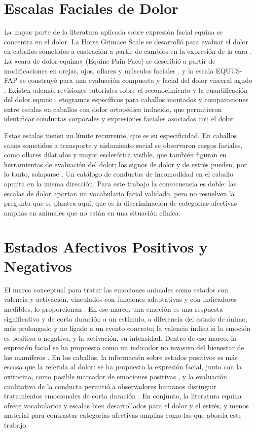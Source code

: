 \section{Escalas Faciales de Dolor}
La mayor parte de la literatura aplicada sobre expresión facial equina se concentra en el dolor. La Horse Grimace Scale se desarrolló para evaluar el dolor en caballos sometidos a castración a partir de cambios en la expresión de la cara \parencite{dallacosta2014}. La «cara de dolor equina» (Equine Pain Face) se describió a partir de modificaciones en orejas, ojos, ollares y músculos faciales \parencite{gleerup2015}, y la escala EQUUS-FAP se construyó para una evaluación compuesta y facial del dolor visceral agudo \parencite{vanloon2015}. Existen además revisiones tutoriales sobre el reconocimiento y la cuantificación del dolor equino \parencite{gleerup2016}, etogramas específicos para caballos montados \parencite{mullard2017,dyson2018} y comparaciones entre escalas en caballos con dolor ortopédico inducido, que permitieron identificar conductas corporales y expresiones faciales asociadas con el dolor \parencite{ask2020}.

Estas escalas tienen un límite recurrente, que es su especificidad. En caballos sanos sometidos a transporte y aislamiento social se observaron rasgos faciales, como ollares dilatados y mayor esclerótica visible, que también figuran en herramientas de evaluación del dolor; los signos de dolor y de estrés pueden, por lo tanto, solaparse \parencite{lundblad2021}. Un catálogo de conductas de incomodidad en el caballo \parencite{torcivia2021} apunta en la misma dirección. Para este trabajo la consecuencia es doble: las escalas de dolor aportan un vocabulario facial validado, pero no resuelven la pregunta que se plantea aquí, que es la discriminación de categorías afectivas amplias en animales que no están en una situación clínica.

\section{Estados Afectivos Positivos y Negativos}
El marco conceptual para tratar las emociones animales como estados con valencia y activación, vinculados con funciones adaptativas y con indicadores medibles, lo proporcionan \textcite{mendl2010}. En ese marco, una emoción es una respuesta significativa y de corta duración a un estímulo, a diferencia del estado de ánimo, más prolongado y no ligado a un evento concreto; la valencia indica si la emoción es positiva o negativa, y la activación, su intensidad. Dentro de ese marco, la expresión facial se ha propuesto como un indicador no invasivo del bienestar de los mamíferos \parencite{descovich2017}. En los caballos, la información sobre estados positivos es más escasa que la referida al dolor: se ha propuesto la expresión facial, junto con la oxitocina, como posible marcador de emociones positivas \parencite{lansade2018}, y la evaluación cualitativa de la conducta permitió a observadores humanos distinguir tratamientos emocionales de corta duración \parencite{hintze2017}. En conjunto, la literatura equina ofrece vocabularios y escalas bien desarrollados para el dolor y el estrés, y menos material para contrastar categorías afectivas amplias como las que aborda este trabajo.

